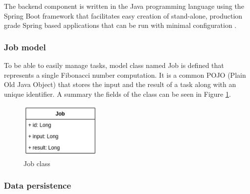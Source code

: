 
The backend component is written in the Java programming language using the Spring Boot framework that facilitates easy creation of stand-alone, production grade Spring based applications that can be run with minimal configuration \cite{SpringBoot}.

\subsubsection{Job model}


To be able to easily manage tasks, model class named Job is defined that represents a single Fibonacci number computation. It is a common POJO (Plain Old Java Object) that stores the input and the result of a task along with an unique identifier. A summary the fields of the class can be seen in Figure \ref{fig:job_model}.

\begin{figure}[h]
	\centering
	\includegraphics[width=40mm, keepaspectratio]{figures/job_class.png}
	\caption{Job class}
	\label{fig:job_model}
\end{figure}

\subsubsection{Data persistence}

